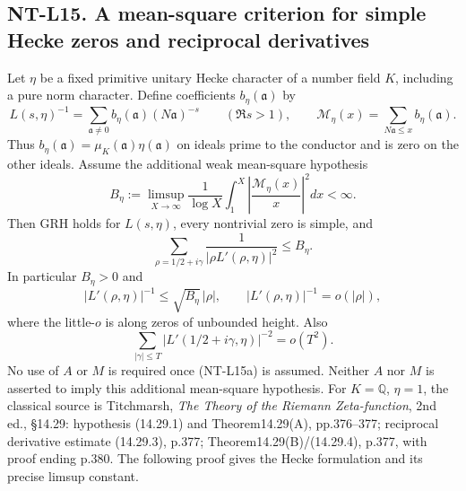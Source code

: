 \documentclass[11pt,a4paper]{article}
\begin{document}
\subsection*{NT-L15. A mean-square criterion for simple Hecke zeros and reciprocal derivatives}
Let $\eta$ be a fixed primitive unitary Hecke character of a number field $K$,
including a pure norm character. Define coefficients $b_\eta(\mathfrak a)$ by
\[
 L(s,\eta)^{-1}=\sum_{\mathfrak a\ne0}
       b_\eta(\mathfrak a)(N\mathfrak a)^{-s}
                    \qquad(\Re s>1),
 \qquad
 \mathcal M_\eta(x)=\sum_{N\mathfrak a\le x}b_\eta(\mathfrak a).
\]
Thus $b_\eta(\mathfrak a)=\mu_K(\mathfrak a)\eta(\mathfrak a)$
on ideals prime to the conductor and is zero on the other ideals.
Assume the additional weak mean-square hypothesis
\[
 B_\eta:=\limsup_{X\to\infty}\frac1{\log X}
       \int_1^X\left|\frac{\mathcal M_\eta(x)}x\right|^2dx<\infty.
                                                        \tag{NT-L15a}
\]
Then GRH holds for $L(s,\eta)$, every nontrivial zero is simple, and
\[
 \sum_{\rho=1/2+i\gamma}\frac1{|\rho L'(\rho,\eta)|^2}
                          \le B_\eta.                   \tag{NT-L15b}
\]
In particular $B_\eta>0$ and
\[
 |L'(\rho,\eta)|^{-1}\le\sqrt{B_\eta}\,|\rho|,
 \qquad |L'(\rho,\eta)|^{-1}=o(|\rho|),
                                                        \tag{NT-L15c}
\]
where the little-$o$ is along zeros of unbounded height. Also
\[
 \sum_{|\gamma|\le T}|L'(1/2+i\gamma,\eta)|^{-2}=o(T^2).
                                                        \tag{NT-L15d}
\]
No use of $A$ or $M$ is required once (NT-L15a) is assumed. Neither $A$ nor
$M$ is asserted to imply this additional mean-square hypothesis.
For $K=\mathbb Q$, $\eta=1$, the classical source is Titchmarsh,
\emph{The Theory of the Riemann Zeta-function}, 2nd ed.,
\S14.29: hypothesis (14.29.1) and Theorem14.29(A), pp.376--377;
reciprocal derivative estimate (14.29.3), p.377;
Theorem14.29(B)/(14.29.4), p.377, with proof ending p.380.
The following proof gives the Hecke formulation and its precise limsup constant.
\end{document}
